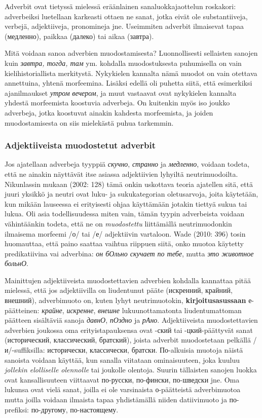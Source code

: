 \documentclass[]{scrartcl}
\begin{document}
Adverbit ovat tietyssä mielessä eräänlainen sanaluokkajaottelun
roskakori: adverbeiksi luetellaan karkeasti ottaen ne sanat, jotka eivät
ole substantiiveja, verbejä, adjektiiveja, pronomineja jne. Useimmiten
adverbit ilmaisevat tapaa (медленно), paikkaa (далеко) tai aikaa
(завтра).

Mitä voidaan sanoa adverbien muodostamisesta? Luonnollisesti sellaisten
sanojen kuin \emph{завтра, тогда, там} ym. kohdalla muodostuksesta
puhumisella on vain kielihistoriallista merkitystä. Nykykielen kannalta
nämä muodot on vain otettava annettuina, yhtenä morfeemina. Lisäksi
edellä oli puhetta siitä, että esimerkiksi ajanilmaukset \emph{утром}
\emph{вечером}, ja muut vastaavat ovat nykykielen kannalta yhdestä
morfeemista koostuvia adverbeja. On kuitenkin myös iso joukko adverbeja,
jotka koostuvat ainakin kahdesta morfeemista, ja joiden muodostamisesta
on siis mielekästä puhua tarkemmin.

\subsubsection{Adjektiiveista muodostetut
adverbit}\label{adjektiiveista-muodostetut-adverbit}

Jos ajatellaan adverbeja tyyppiä \emph{скучно}, \emph{странно} ja
\emph{медленно}, voidaan todeta, että ne ainakin näyttävät itse asiassa
adjektiivien lyhyiltä neutrimuodoilta. Nikunlassin mukaan (2002: 128)
tämä onkin uskottava teoria ajatellen sitä, että juuri yksikkö ja neutri
ovat luku- ja sukukategorian oletusarvoja, joita käytetään, kun mikään
lauseessa ei erityisesti ohjaa käyttämään jotakin tiettyä sukua tai
lukua. Oli asia todellisuudessa miten vain, tämän tyypin adverbeista
voidaan vähintäänkin todeta, että ne on \emph{muodostettu} liittämällä
neutrimuodonkin ilmaisema morfeemi /о/ tai /е/ adjektiivin vartaloon.
Wade (2010: 396) tosin huomauttaa, että paino saattaa vaihtua riippuen
siitä, onko muotoa käytetty predikatiivina vai adverbina: \emph{он
бОльно скучает по тебе}, mutta \emph{это животное больнО}.

Mainittujen adjektiiveista muodostettavien adverbien kohdalla kannattaa
pitää mielessä, että jos adjektiivilla on liudentunut pääte (искренний,
крайний, внешний), adverbimuoto on, kuten lyhyt neutrimuotokin,
\textbf{kirjoitusasussaan} е-päätteinen: \emph{крайне}, \emph{искренне},
\emph{внешне} lukuunottamatonta liudentumattoman päätteen sisältäviä
sanoja \emph{давнО}, \emph{пОздно} ja \emph{рАно}. Adjektiiveista
muodostettavien adverbien joukossa oma erityistapauksensa ovat -ский tai
-цкий-päättyvät sanat (исторический, классический, братский), joista
adverbit muodostetaan pelkällä /и/-suffiksilla: исторически,
классически, братски. По-alkuisia muotoja näistä sanoista voidaan
käyttää, kun sanalla viitataan ominaisuuteen, joka kuuluu \emph{jollekin
elolliselle olennolle} tai joukolle olentoja. Suurin tällaisten sanojen
luokka ovat kansallisuuteen viittaavat по-русски, по-фински, по-шведски
jne. Oma lukunsa ovat vielä sanat, joilla ei ole varsinaista
о-päätteistä adverbimuotoa mutta joilla voidaan ilmaista tapaa
yhdistämällä niiden datiivimuoto ja по-prefiksi: по-другому,
по-настоящему.
\end{document}
